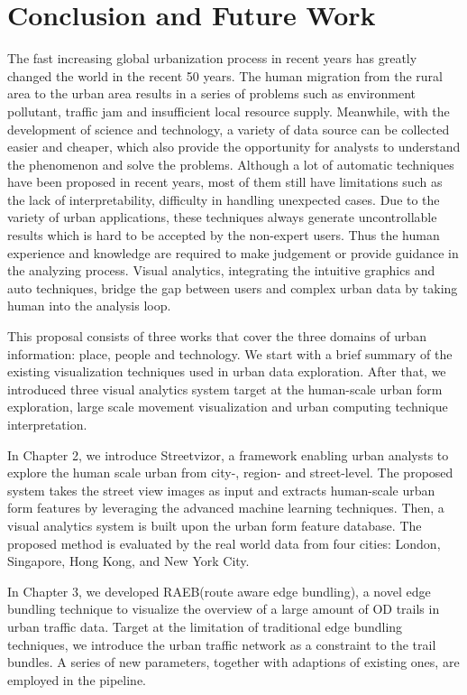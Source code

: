 \chapter{Conclusion and Future Work}

The fast increasing global urbanization process in recent years has greatly changed the world in the recent 50 years. The human migration from the rural area to the urban area results in a series of problems such as environment pollutant, traffic jam and insufficient local resource supply. Meanwhile, with the development of science and technology, a variety of data source can be collected easier and cheaper, which also provide the opportunity for analysts to understand the phenomenon and solve the problems. Although a lot of automatic techniques have been proposed in recent years, most of them still have limitations such as the lack of interpretability, difficulty in handling unexpected cases. Due to the variety of urban applications, these techniques always generate uncontrollable results which is hard to be accepted by the non-expert users. Thus the human experience and knowledge are required to make judgement or provide guidance in the analyzing process. Visual analytics, integrating the intuitive graphics and auto techniques, bridge the gap between users and complex urban data by taking human into the analysis loop.  

This proposal consists of three works that cover the three domains of urban information: place, people and technology. We start with a brief summary of the existing visualization techniques used in urban data exploration. After that, we introduced three visual analytics system target at the human-scale urban form exploration, large scale movement visualization and urban computing technique interpretation. 

In Chapter 2, we introduce Streetvizor, a framework enabling urban analysts to explore the human scale urban from city-, region- and street-level. The proposed system takes the street view images as input and extracts human-scale urban form features by leveraging the advanced machine learning techniques. Then, a visual analytics system is built upon the urban form feature database. The proposed method is evaluated by the real world data from four cities: London, Singapore, Hong Kong, and New York City. 

In Chapter 3, we developed RAEB(route aware edge bundling), a novel edge bundling technique to visualize the overview of a large amount of OD trails in urban traffic data. Target at the limitation of traditional edge bundling techniques, we introduce the urban traffic network as a constraint to the trail bundles. A series of new parameters, together with adaptions of existing ones, are employed in the pipeline.

